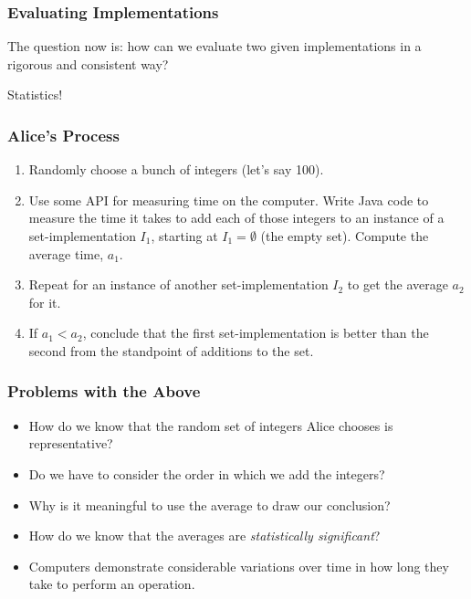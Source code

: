 \begin{frame}
\frametitle{Evaluating Implementations}
\begin{changemargin}{1cm}

The question now is: how can we evaluate two given implementations in a rigorous and consistent way?

Statistics!

\end{changemargin}
\end{frame}

\begin{frame}
\frametitle{Alice's Process}
\begin{changemargin}{1cm}

\begin{enumerate}
\item Randomly choose a bunch of integers (let's say 100).

\item Use some API for measuring time on the computer.
Write Java code to measure the time it takes to add each of
those integers to an instance of a set-implementation $I_1$,
starting at $I_1 = \emptyset$ (the empty set). Compute the average time, $a_1$.

\item Repeat for an instance of another set-implementation
$I_2$ to get the average $a_2$ for it.

\item If $a_1 < a_2$, conclude that the first set-implementation
is better than the second from the standpoint of additions to the set.
\end{enumerate}

\end{changemargin}
\end{frame}

\begin{frame}
\frametitle{Problems with the Above}
\begin{changemargin}{1cm}

\begin{itemize}
    \item How do we know that the random set of integers Alice chooses
	is representative?
    \item Do we have to consider the order in which we add
	the integers?
    \item Why is it meaningful to use the average to draw our
	conclusion?
    \item How do we know that the averages are \emph{statistically
	significant}? 
    \item Computers demonstrate considerable variations over
	time in how long they take to perform an operation.
\end{itemize}

\end{changemargin}
\end{frame}


